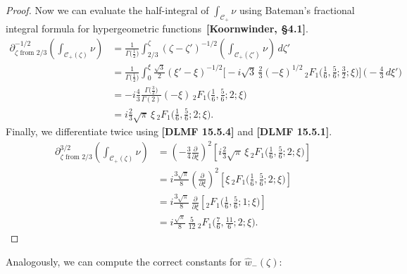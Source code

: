 \documentclass{article}
\theoremstyle{definition}
\begin{document}
\begin{proof}
Now we can evaluate the half-integral of $\int_{\mathcal{C}_+} \nu$ using Bateman's fractional integral formula for hypergeometric functions~\textbf{[Koornwinder, \S 4.1]}.
\begin{align*}
\partial^{-1/2}_{\zeta \text{ from } 2/3} \left( \int_{\mathcal{C}_+(\zeta)} \nu \right) & = \frac{1}{\Gamma\big(\tfrac{1}{2}\big)} \int_{2/3}^\zeta (\zeta - \zeta')^{-1/2} \left( \int_{\mathcal{C}_+(\zeta')} \nu \right)\,d\zeta' \\
& = \frac{1}{\Gamma\big(\tfrac{1}{2}\big)} \int_0^\xi \tfrac{\sqrt{3}}{2} (\xi' - \xi)^{-1/2} \Big[ -{i}{\sqrt{3}}\,\tfrac{2}{3} (-\xi)^{1/2}\,{}_2F_1\big(\tfrac{1}{6}, \tfrac{5}{6}; \tfrac{3}{2}; \xi\big) \Big] \,\big( -\tfrac{4}{3}\,d\xi' \big) \\
& = -i \frac{4}{3} \frac{\Gamma\big(\tfrac{3}{2}\big)}{\Gamma(2)} (-\xi)\,{}_2F_1\big(\tfrac{1}{6}, \tfrac{5}{6}; 2; \xi\big) \\
& = i \frac{2}{3} \sqrt{\pi}\,\xi\, {}_2F_1\big(\tfrac{1}{6}, \tfrac{5}{6}; 2; \xi\big).
\end{align*}
Finally, we differentiate twice using \textbf{[DLMF 15.5.4]} and \textbf{[DLMF 15.5.1]}.
\begin{align*}
\partial^{3/2}_{\zeta \text{ from } 2/3} \left( \int_{\mathcal{C}_+(\zeta)} \nu \right) & = \left(-\tfrac{3}{4} \tfrac{\partial}{\partial \xi}\right)^2 \left[ i \frac{2}{3} \sqrt{\pi}\,\xi\, {}_2F_1\big(\tfrac{1}{6}, \tfrac{5}{6}; 2; \xi\big) \right] \\
& = i \tfrac{3\sqrt{\pi}}{8} \left(\tfrac{\partial}{\partial \xi}\right)^2 \left[ \xi\,{}_2F_1\big(\tfrac{1}{6}, \tfrac{5}{6}; 2; \xi\big) \right] \\
& = i \tfrac{3\sqrt{\pi}}{8}\,\tfrac{\partial}{\partial \xi} \left[ {}_2F_1\big(\tfrac{1}{6}, \tfrac{5}{6}; 1; \xi\big) \right] \\
& = i \tfrac{\sqrt{\pi}}{8}\,\tfrac{5}{12}\, {}_2F_1\big(\tfrac{7}{6}, \tfrac{11}{6}; 2; \xi\big).
\end{align*}
\end{proof}
Analogously, we can compute the correct constants for $\hat{w}_-(\zeta)$:
\end{document}

